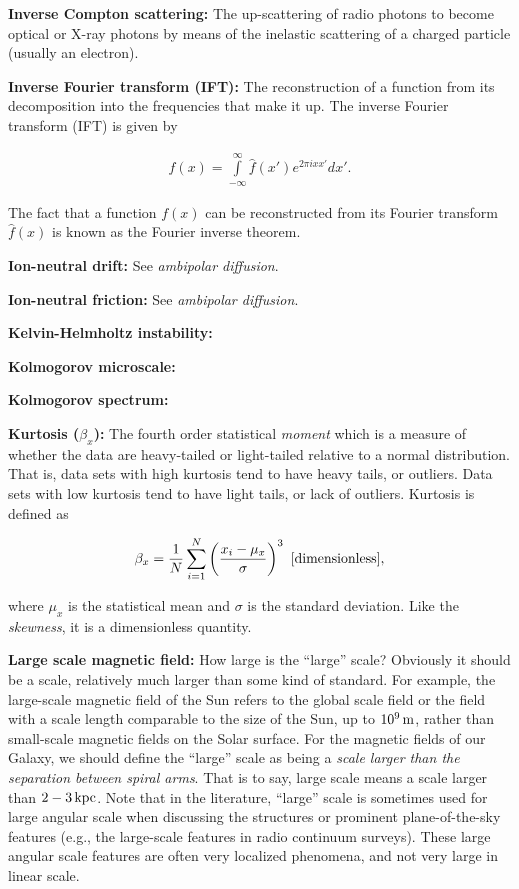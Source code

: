 \documentclass[a4paper,10pt]{article}
\begin{document}
{\noindent}\textbf{Inverse Compton scattering:} The up-scattering of radio photons to become optical or X-ray photons by means of the inelastic scattering of a charged particle (usually an electron).

{\noindent}\textbf{Inverse Fourier transform (IFT):} The reconstruction of a function from its decomposition into the frequencies that make it up. The inverse Fourier transform (IFT) is given by

\begin{align*}
    f(x) = \int\limits_{-\infty}^\infty \hat{f}(x')e^{2\pi ixx'}dx'.
\end{align*}

{\noindent}The fact that a function $f(x)$ can be reconstructed from its Fourier transform $\hat{f}(x)$ is known as the Fourier inverse theorem.

{\noindent}\textbf{Ion-neutral drift:} See \textit{ambipolar diffusion}.

{\noindent}\textbf{Ion-neutral friction:} See \textit{ambipolar diffusion}.

{\noindent}\textbf{Kelvin-Helmholtz instability:}

{\noindent}\textbf{Kolmogorov microscale:}

{\noindent}\textbf{Kolmogorov spectrum:}

{\noindent}\textbf{Kurtosis ($\beta_x$):} The fourth order statistical \textit{moment} which is a measure of whether the data are heavy-tailed or light-tailed relative to a normal distribution. That is, data sets with high kurtosis tend to have heavy tails, or outliers. Data sets with low kurtosis tend to have light tails, or lack of outliers. Kurtosis is defined as

\begin{align*}
    \beta_x = \frac{1}{N} \sum_{i=1}^N \left(\frac{x_i-\mu_x}{\sigma}\right)^3 ~ [{\rm dimensionless}],
\end{align*}

{\noindent}where $\mu_x$ is the statistical mean and $\sigma$ is the standard deviation. Like the \textit{skewness}, it is a dimensionless quantity.

{\noindent}\textbf{Large scale magnetic field:} How large is the ``large'' scale? Obviously it should be a scale, relatively much larger than some kind of standard. For example, the large-scale magnetic field of the Sun refers to the global scale field or the field with a scale length comparable to the size of the Sun, up to $10^9\,{\rm m}$, rather than small-scale magnetic fields on the Solar surface. For the magnetic fields of our Galaxy, we should define the ``large'' scale as being a \textit{scale larger than the separation between spiral arms}. That is to say, large scale means a scale larger than $2-3\,{\rm kpc}$. Note that in the literature, ``large'' scale is sometimes used for large angular scale when discussing the structures or prominent plane-of-the-sky features (e.g., the large-scale features in radio continuum surveys). These large angular scale features are often very localized phenomena, and not very large in linear scale.
\end{document}
